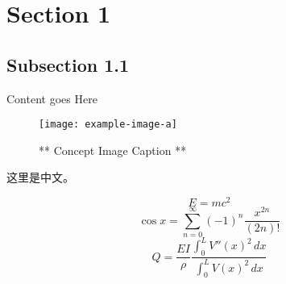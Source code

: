 \graphicspath{{Images/}}

\section{Section 1}
    \subsection{Subsection 1.1}

    Content goes Here


\begin{figure}[h]
    \centering
    \texttt{[image: example-image-a]}
    \caption{** Concept Image Caption **}
    \label{fig:my_label}
\end{figure}


这里是中文。

\begin{equation}
    E = mc^2
\end{equation}
\begin{equation}
    \cos{x} = \sum_{n=0}^{\infty} (-1)^n \frac{x^{2n}}{(2n)!}
\end{equation}
\begin{equation}
    Q = \frac{EI}{\rho}\frac{\int_0^L {V''(x)}^2 \,dx}{\int_0^L {V(x)}^2 \,dx}
\end{equation}